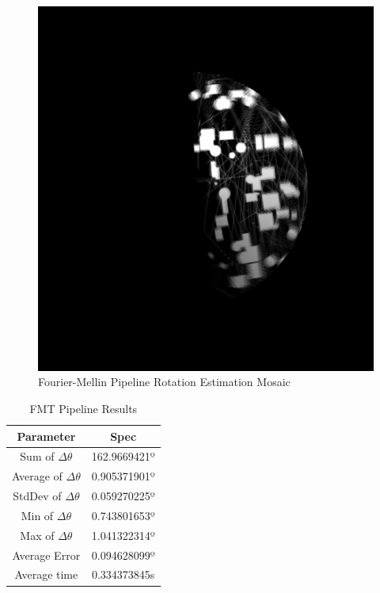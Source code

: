 \begin{figure}[H]
  \centering
  \includegraphics[width=.7\textwidth]{figures/results/rotation-skip-0/FMT.png}
  \caption[Fourier-Mellin Pipeline Rotation Estimation Mosaic]{Fourier-Mellin Pipeline Rotation Estimation Mosaic}
  \label{fig:fmcombined-skip-0}
\end{figure}

\begin{table}[H]
    \centering
    \begin{tabular}{|c|c|}
        \hline
        \textbf{Parameter} & \textbf{Spec} \\ \hline
        Sum of $\Delta\theta$ & 162.9669421º \\ \hline
        Average of $\Delta\theta$ & 0.905371901º \\ \hline
        StdDev of $\Delta\theta$ & 0.059270225º \\ \hline
        Min of $\Delta\theta$ & 0.743801653º \\ \hline
        Max of $\Delta\theta$ & 1.041322314º \\ \hline
        Average Error & 0.094628099º \\ \hline
        Average time & 0.334373845s \\ \hline
    \end{tabular}
    \caption{FMT Pipeline Results}
\end{table}



